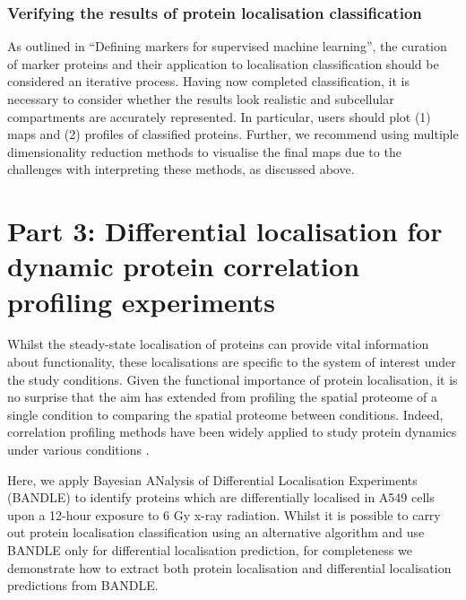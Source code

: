 \documentclass[9pt,a4paper,]{extarticle}
\begin{document}
\subsubsection{Verifying the results of protein localisation classification}\label{verifying-the-results-of-protein-localisation-classification}

As outlined in ``Defining markers for supervised machine learning'', the
curation of marker proteins and their application to localisation classification
should be considered an iterative process. Having now completed classification,
it is necessary to consider whether the results look realistic and subcellular
compartments are accurately represented. In particular, users should plot (1)
maps and (2) profiles of classified proteins. Further, we recommend using multiple
dimensionality reduction methods to visualise the final maps due to the challenges
with interpreting these methods, as discussed above.

\section{Part 3: Differential localisation for dynamic protein correlation profiling experiments}\label{part-3-differential-localisation-for-dynamic-protein-correlation-profiling-experiments}

Whilst the steady-state localisation of proteins can provide vital information
about functionality, these localisations are specific to the system of interest
under the study conditions. Given the functional importance of protein
localisation, it is no surprise that the aim has extended from profiling the
spatial proteome of a single condition to comparing the spatial proteome between
conditions. Indeed, correlation profiling methods have been widely applied to
study protein dynamics under various conditions \citep{Itzhak2016, Orre2019, Christopher2025, JeanBeltran2016, Mulvey2021, Shin2020, Krahmer2018, Kozik2020, Hirst2018}.

Here, we apply Bayesian ANalysis of Differential Localisation Experiments
(BANDLE) \citep{Crook2022} to identify proteins which are differentially localised in
A549 cells upon a 12-hour exposure to 6 Gy x-ray radiation. Whilst it is
possible to carry out protein localisation classification using an alternative
algorithm and use BANDLE only for differential localisation prediction, for
completeness we demonstrate how to extract both protein localisation and
differential localisation predictions from BANDLE.
\end{document}
